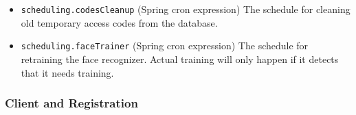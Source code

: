 \begin{itemize}
\item \verb!scheduling.codesCleanup! (Spring cron expression) The schedule for cleaning old temporary access codes from the database.
\item \verb!scheduling.faceTrainer! (Spring cron expression) The schedule for retraining the face recognizer. Actual training will only happen if it detects that it needs training. 

\end{itemize}
\subsubsection{Client and Registration}